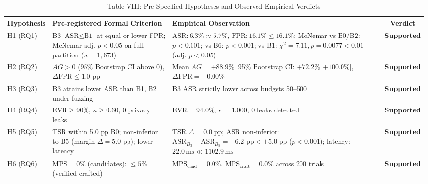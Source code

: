 \begin{table}[t]
\centering
\caption{Table VIII: Pre-Specified Hypotheses and Observed Empirical Verdicts}
\begin{tabular}{l p{5.5cm} p{8.5cm} c}
\hline
\textbf{Hypothesis} & \textbf{Pre-registered Formal Criterion} & \textbf{Empirical Observation} & \textbf{Verdict} \\
\hline
H1 (RQ1) & B3 $\text{ASR} \le \text{B1}$ at equal or lower FPR; McNemar adj. $p < 0.05$ on full partition ($n=1,673$) & $\text{ASR}: 6.3\% \approx 5.7\%$, $\text{FPR}: 16.1\% \le 16.1\%$; McNemar vs B0/B2: $p < 0.001$; vs B6: $p < 0.001$; vs B1: $\chi^2 = 7.11, p = 0.0077 < 0.01$ (adj. $p < 0.05$) & \textbf{Supported} \\
H2 (RQ2) & $AG > 0$ (95\% Bootstrap CI above 0), $\Delta\text{FPR} \le 1.0\text{ pp}$ & Mean $AG = +88.9\%$ [95\% Bootstrap CI: $+72.2\%, +100.0\%$], $\Delta\text{FPR} = +0.00\%$ & \textbf{Supported} \\
H3 (RQ3) & B3 attains lower ASR than B1, B2 under fuzzing & B3 ASR strictly lower across budgets 50--500 & \textbf{Supported} \\
H4 (RQ4) & $\text{EVR} \ge 90\%$, $\kappa \ge 0.60$, 0 privacy leaks & $\text{EVR} = 94.0\%$, $\kappa = 1.000$, 0 leaks detected & \textbf{Supported} \\
H5 (RQ5) & TSR within 5.0 pp B0; non-inferior to B5 (margin $\Delta = 5.0\text{ pp}$); lower latency & TSR $\Delta = 0.0\text{ pp}$; ASR non-inferior: $\text{ASR}_{B_3} - \text{ASR}_{B_5} = -6.2\text{ pp} < +5.0\text{ pp}$ ($p < 0.001$); latency: $22.0\,\text{ms} \ll 1102.9\,\text{ms}$ & \textbf{Supported} \\
H6 (RQ6) & $\text{MPS} = 0\%$ (candidates); $\le 5\%$ (verified-crafted) & $\text{MPS}_{\text{cand}} = 0.0\%$, $\text{MPS}_{\text{craft}} = 0.0\%$ across 200 trials & \textbf{Supported} \\
\hline
\end{tabular}
\end{table}
